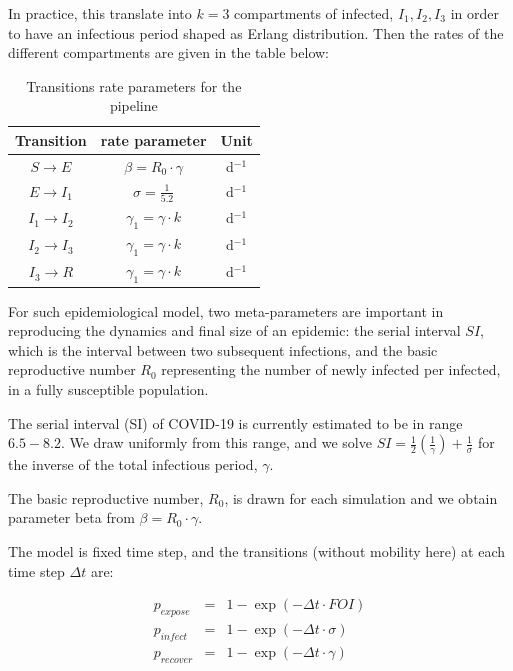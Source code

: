In practice, this translate into $k = 3$ compartments of infected, $I_1, I_2, I_3$ in 
order to have an infectious period shaped as Erlang distribution.
Then the rates of the different compartments are given in the table below:

\begin{table}
    \centering
    \begin{tabular}{ccc}
\toprule
Transition & rate parameter &Unit \\
 \midrule
$S\longrightarrow E$  &   $\beta = R_0 \cdot \gamma$  & d$^{-1}$\\
$E\longrightarrow I_1$ & $\sigma = \frac{1}{5.2}$         & d$^{-1}$\\
$I_1\longrightarrow I_2$ & $\gamma_1 = \gamma \cdot k$ & d$^{-1}$\\
$I_2\longrightarrow I_3$ & $\gamma_1 = \gamma \cdot k$ & d$^{-1}$\\
$I_3\longrightarrow R$ & $\gamma_1 = \gamma \cdot k$&d$^{-1}$\\
\bottomrule
\end{tabular}
\caption{Transitions rate parameters for the pipeline}
     \label{tab:survpars}
\end{table}

For such epidemiological model, two meta-parameters are important in reproducing 
the dynamics and final size of an epidemic: the serial interval $SI$, which is 
the interval between two subsequent infections, and the basic reproductive number 
$R_0$ representing the number of newly infected per infected, in a fully susceptible population.


The serial interval (SI) of COVID-19 is currently estimated to be in range $6.5-8.2$. We draw uniformly from this range, and we solve
$SI = \frac{1}{2}(\frac{1}{\gamma})+\frac{1}{\sigma}$ for the inverse of the total infectious period, $\gamma$.

The basic reproductive number, $R_0$, is drawn for each simulation and we obtain parameter beta from
$\beta= R_0 \cdot \gamma$.

The model is fixed time step, and the transitions (without mobility here) at each time step
$\Delta t$ are: 

\begin{eqnarray}
p_{expose} &=&  1 - \exp(-\Delta t \cdot FOI) \\
p_{infect} &=& 1 - \exp(-\Delta t \cdot \sigma)\\
p_{recover} &=& 1 - \exp(-\Delta t \cdot \gamma)
\end{eqnarray}

